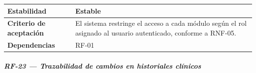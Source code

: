 \documentclass[
]{article}
\begin{document}
{\begin{longtable}[]{|
  >{\raggedright\arraybackslash}p{}|
  >{\raggedright\arraybackslash}p{}|}
\hline
\textbf{Estabilidad} & \begin{minipage}[t]{\linewidth}\raggedright
Estable
\end{minipage} \\
\hline
\textbf{Criterio de aceptación} &
\begin{minipage}[t]{\linewidth}\raggedright
El sistema restringe el acceso a cada módulo según el rol asignado al usuario autenticado, conforme a RNF-05.
\end{minipage} \\
\hline
\textbf{Dependencias} & \begin{minipage}[t]{\linewidth}\raggedright
RF-01
\end{minipage} \\
\hline
\end{longtable}
}

\subparagraph{RF-23 --- Trazabilidad de cambios en historiales clínicos}\label{rf-23-trazabilidad-de-cambios-en-historiales-c}
\end{document}
